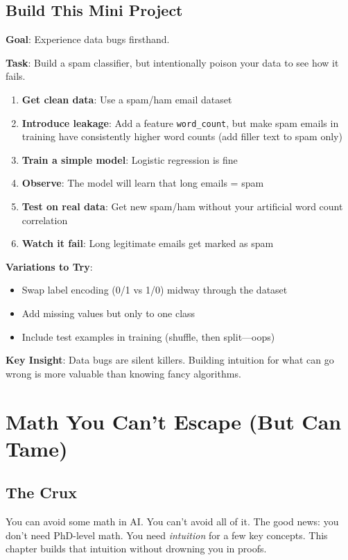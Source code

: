 \documentclass[11pt,oneside]{book}
\newcommand{\blankpage}{%
    \clearpage
    \thispagestyle{empty}
    \mbox{}
    \clearpage
}
\begin{document}
\section{Build This Mini Project}

\textbf{Goal}: Experience data bugs firsthand.

\textbf{Task}: Build a spam classifier, but intentionally poison your data to see how it fails.

\begin{enumerate}
\item \textbf{Get clean data}: Use a spam/ham email dataset
\item \textbf{Introduce leakage}: Add a feature \texttt{word\_count}, but make spam emails in training have consistently higher word counts (add filler text to spam only)
\item \textbf{Train a simple model}: Logistic regression is fine
\item \textbf{Observe}: The model will learn that long emails = spam
\item \textbf{Test on real data}: Get new spam/ham without your artificial word count correlation
\item \textbf{Watch it fail}: Long legitimate emails get marked as spam
\end{enumerate}

\textbf{Variations to Try}:
\begin{itemize}
\item Swap label encoding (0/1 vs 1/0) midway through the dataset
\item Add missing values but only to one class
\item Include test examples in training (shuffle, then split—oops)
\end{itemize}

\textbf{Key Insight}: Data bugs are silent killers. Building intuition for what can go wrong is more valuable than knowing fancy algorithms.

\blankpage


\chapter{Math You Can't Escape (But Can Tame)}

\section{The Crux}
You can avoid some math in AI. You can't avoid all of it. The good news: you don't need PhD-level math. You need \textit{intuition} for a few key concepts. This chapter builds that intuition without drowning you in proofs.
\end{document}
